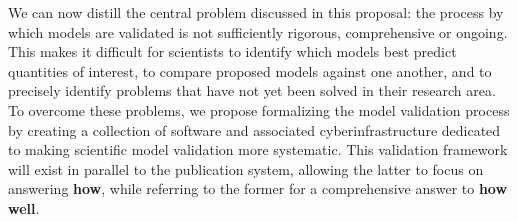 \documentclass[11pt,letterpaper]{article}
\begin{document}
We can now distill the central problem discussed in this proposal: the process by which models are validated is not sufficiently rigorous, comprehensive or ongoing. This makes it difficult for scientists to identify which models best predict quantities of interest, to compare proposed models against one another, and to precisely identify problems that have not yet been solved in their research area. To overcome these problems, we propose formalizing the model validation process by creating a collection of software and associated cyberinfrastructure dedicated to making scientific model validation more systematic.  This validation framework will exist in parallel to the publication system, allowing the latter to focus on answering \textbf{how}, while referring to the former for a comprehensive answer to \textbf{how well}. 
\end{document}
